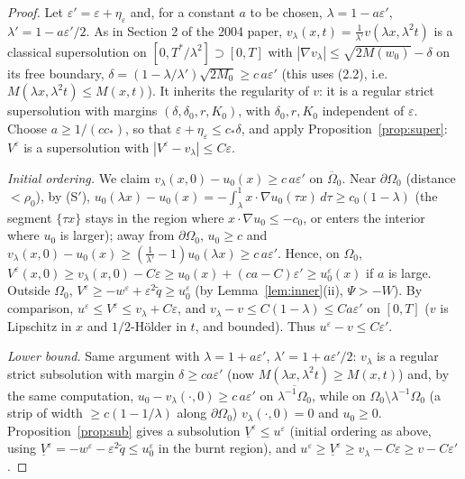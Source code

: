 \documentclass[11pt]{amsart}
\theoremstyle{definition}
\theoremstyle{remark}
\newcommand{\ve}{\varepsilon}
\begin{document}
\begin{proof}
Let $\ve'=\ve+\eta_\ve$ and, for a constant $a$ to be chosen, $\lambda=1-a\ve'$,
$\lambda'=1-a\ve'/2$. As in Section 2 of the 2004 paper,
$v_\lambda(x,t)=\frac1{\lambda'}v(\lambda x,\lambda^2t)$ is a classical supersolution on
$[0,T^*/\lambda^2]\supset[0,T]$ with
$|\nabla v_\lambda|\le\sqrt{2M(w_0)}-\delta$ on its free boundary,
$\delta=(1-\lambda/\lambda')\sqrt{2M_0}\ge c\,a\ve'$ (this uses (2.2), i.e.
$M(\lambda x,\lambda^2t)\le M(x,t)$). It inherits the regularity of $v$: it is a
regular strict supersolution with margins $(\delta,\delta_0,r,K_0)$, with
$\delta_0,r,K_0$ independent of $\ve$. Choose $a\ge1/(cc_*)$, so that
$\ve+\eta_\ve\le c_*\delta$, and apply Proposition~\ref{prop:super}: $V^\ve$ is a
supersolution with $|V^\ve-v_\lambda|\le C\ve$.

\emph{Initial ordering.} We claim $v_\lambda(x,0)-u_0(x)\ge c\,a\ve'$ on
$\overline\Omega_0$. Near $\partial\Omega_0$ (distance $<\rho_0$), by (S$'$),
$u_0(\lambda x)-u_0(x)=-\int_\lambda^1x\cdot\nabla u_0(\tau x)\,d\tau\ge c_0(1-\lambda)$ (the
segment $\{\tau x\}$ stays in the region where $x\cdot\nabla u_0\le-c_0$, or enters the
interior where $u_0$ is larger); away from $\partial\Omega_0$, $u_0\ge c$ and
$v_\lambda(x,0)-u_0(x)\ge(\frac1{\lambda'}-1)u_0(\lambda x)\ge c\,a\ve'$. Hence, on $\Omega_0$,
$V^\ve(x,0)\ge v_\lambda(x,0)-C\ve\ge u_0(x)+(ca-C)\ve'\ge u_0^\ve(x)$ if $a$ is large. Outside
$\Omega_0$, $V^\ve\ge-w^\ve+\ve^2\tilde q\ge u_0^\ve$ (by Lemma~\ref{lem:inner}(ii),
$\Psi>-W$). By comparison, $u^\ve\le V^\ve\le v_\lambda+C\ve$, and
$v_\lambda-v\le C(1-\lambda)\le Ca\ve'$ on $[0,T]$ ($v$ is Lipschitz in $x$ and
$1/2$-H\"older in $t$, and bounded). Thus $u^\ve-v\le C\ve'$.

\emph{Lower bound.} Same argument with $\lambda=1+a\ve'$, $\lambda'=1+a\ve'/2$:
$v_\lambda$ is a regular strict subsolution with margin $\delta\ge ca\ve'$
(now $M(\lambda x,\lambda^2t)\ge M(x,t)$) and, by the same computation,
$u_0-v_\lambda(\cdot,0)\ge c\,a\ve'$ on $\overline{\lambda^{-1}\Omega_0}$, while on
$\Omega_0\setminus\lambda^{-1}\Omega_0$ (a strip of width $\ge c(1-1/\lambda)$ along
$\partial\Omega_0$) $v_\lambda(\cdot,0)=0$ and $u_0\ge0$. Proposition~\ref{prop:sub} gives a subsolution
$\underline V^\ve\le u^\ve$ (initial ordering as above, using
$\underline V^\ve=-w^\ve-\ve^2\tilde q\le u_0^\ve$ in the burnt region), and
$u^\ve\ge\underline V^\ve\ge v_\lambda-C\ve\ge v-C\ve'$.
\end{proof}
\end{document}
